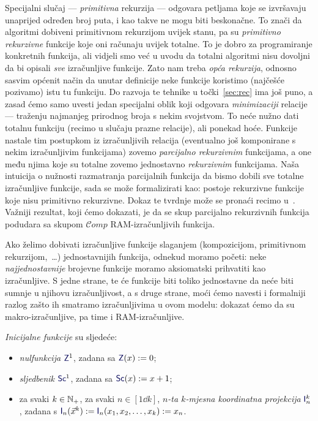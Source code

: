 Specijalni slučaj --- \emph{primitivna} rekurzija --- odgovara petljama koje se izvršavaju unaprijed određen broj puta, i kao takve ne mogu biti beskonačne. To znači da algoritmi dobiveni primitivnom rekurzijom uvijek stanu, pa su \emph{primitivno rekurzivne} funkcije koje oni računaju uvijek totalne. To je dobro za programiranje konkretnih funkcija, ali vidjeli smo već u uvodu da totalni algoritmi nisu dovoljni da bi opisali \emph{sve} izračunljive funkcije. Zato nam treba \emph{opća rekurzija}, odnosno sasvim općenit način da unutar definicije neke funkcije koristimo (najčešće pozivamo) istu tu funkciju. Do razvoja te tehnike u točki~\ref{sec:rec} ima još puno, a zasad ćemo samo uvesti jedan specijalni oblik koji odgovara \emph{minimizaciji} relacije --- traženju najmanjeg prirodnog broja s nekim svojstvom. To neće nužno dati totalnu funkciju (recimo u slučaju prazne relacije), ali ponekad hoće. Funkcije nastale tim postupkom iz izračunljivih relacija (eventualno još komponirane s nekim izračunljivim funkcijama) zovemo \emph{parcijalno rekurzivnim} funkcijama, a one među njima koje su totalne zovemo jednostavno \emph{rekurzivnim} funkcijama. Naša intuicija o nužnosti razmatranja parcijalnih funkcija da bismo dobili sve totalne izračunljive funkcije, sada se može formalizirati kao: postoje rekurzivne funkcije koje nisu primitivno rekurzivne. Dokaz te tvrdnje može se pronaći recimo u~\cite[dodatak]{skr:Vuk}. Važniji rezultat, koji ćemo dokazati, je da se skup parcijalno rekurzivnih funkcija podudara sa skupom $\mathscr Comp$ RAM-izračunljivih funkcija. %


Ako želimo dobivati izračunljive funkcije slaganjem (kompozicijom, primitivnom rekurzijom,~\ldots) jednostavnijih funkcija, odnekud moramo početi: neke \emph{najjednostavnije} brojevne funkcije moramo aksiomatski prihvatiti kao izračunljive. S jedne strane, te će funkcije biti toliko jednostavne da neće biti sumnje u njihovu izračunljivost, a s druge strane, moći ćemo navesti i formalniji razlog zašto ih smatramo izračunljivima u ovom modelu: dokazat ćemo da su makro-izračunljive, pa time i RAM-izračunljive.

\begin{definicija}[{name=[inicijalne funkcije]}]\label{def:init}
\emph{Inicijalne funkcije} su sljedeće:
\begin{itemize}
    \item \emph{nulfunkcija} $\f Z^1$, zadana sa $\f Z(x):=0$;
    \item \emph{sljedbenik} $\f{Sc}^1$, zadana sa $\f{Sc}(x):=x+1$;
    \item za svaki $k\in{\mathbb N}_+$, za svaki $n\in[1\dd k]$, \emph{$n$-ta $k$-mjesna koordinatna projekcija} $\f I_n^k$, zadana s $\f I_n(\vec x^k):=\f I_n(x_1,x_2,\dotsc,x_k):=x_n$.\qedhere
\end{itemize}
\end{definicija}


